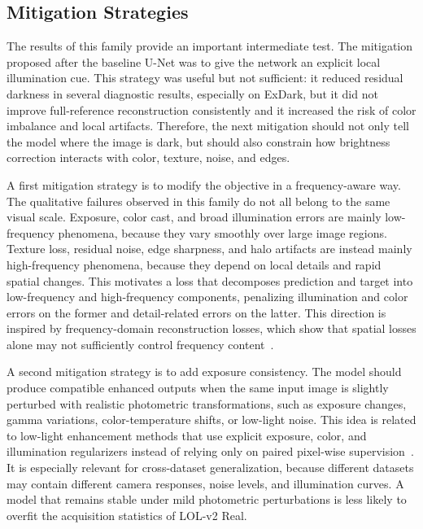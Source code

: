 \subsection{Mitigation Strategies}

The results of this family provide an important intermediate test. The mitigation proposed after the baseline U-Net was to give the network an explicit local illumination cue. This strategy was useful but not sufficient: it reduced residual darkness in several diagnostic results, especially on ExDark, but it did not improve full-reference reconstruction consistently and it increased the risk of color imbalance and local artifacts. Therefore, the next mitigation should not only tell the model where the image is dark, but should also constrain how brightness correction interacts with color, texture, noise, and edges.

A first mitigation strategy is to modify the objective in a frequency-aware way. The qualitative failures observed in this family do not all belong to the same visual scale. Exposure, color cast, and broad illumination errors are mainly low-frequency phenomena, because they vary smoothly over large image regions. Texture loss, residual noise, edge sharpness, and halo artifacts are instead mainly high-frequency phenomena, because they depend on local details and rapid spatial changes. This motivates a loss that decomposes prediction and target into low-frequency and high-frequency components, penalizing illumination and color errors on the former and detail-related errors on the latter. This direction is inspired by frequency-domain reconstruction losses, which show that spatial losses alone may not sufficiently control frequency content~\cite{DBLP:conf/iccv/JiangDWL21}.

A second mitigation strategy is to add exposure consistency. The model should produce compatible enhanced outputs when the same input image is slightly perturbed with realistic photometric transformations, such as exposure changes, gamma variations, color-temperature shifts, or low-light noise. This idea is related to low-light enhancement methods that use explicit exposure, color, and illumination regularizers instead of relying only on paired pixel-wise supervision~\cite{DBLP:conf/cvpr/GuoLGLHKC20}. It is especially relevant for cross-dataset generalization, because different datasets may contain different camera responses, noise levels, and illumination curves. A model that remains stable under mild photometric perturbations is less likely to overfit the acquisition statistics of LOL-v2 Real.

